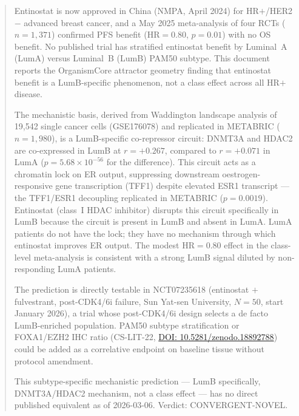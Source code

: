 \documentclass[12pt, a4paper]{article}
\begin{document}
\begin{abstract}
\noindent
Entinostat is now approved in China (NMPA,
April 2024) for HR$+$/HER2$-$ advanced breast
cancer, and a May 2025 meta-analysis of four
RCTs ($n=1{,}371$) confirmed PFS benefit
(HR$=0.80$, $p=0.01$) with no OS benefit. No
published trial has stratified entinostat
benefit by Luminal~A (LumA) versus Luminal~B
(LumB) PAM50 subtype. This document reports
the OrganismCore attractor geometry finding that
entinostat benefit is a LumB-specific phenomenon,
not a class effect across all HR$+$ disease.

The mechanistic basis, derived from Waddington
landscape analysis of 19,542 single cancer cells
(GSE176078) and replicated in METABRIC
($n=1{,}980$), is a LumB-specific co-repressor
circuit: DNMT3A and HDAC2 are co-expressed in
LumB at $r=+0.267$, compared to $r=+0.071$ in
LumA ($p=5.68\times10^{-56}$ for the difference).
This circuit acts as a chromatin lock on ER
output, suppressing downstream oestrogen-responsive
gene transcription (TFF1) despite elevated
ESR1 transcript --- the TFF1/ESR1 decoupling
replicated in METABRIC ($p=0.0019$). Entinostat
(class~I HDAC inhibitor) disrupts this circuit
specifically in LumB because the circuit is
present in LumB and absent in LumA. LumA patients
do not have the lock; they have no mechanism
through which entinostat improves ER output. The
modest HR$=0.80$ effect in the class-level
meta-analysis is consistent with a strong LumB
signal diluted by non-responding LumA patients.

The prediction is directly testable in
NCT07235618 (entinostat $+$ fulvestrant,
post-CDK4/6i failure, Sun Yat-sen University,
$N=50$, start January 2026), a trial whose
post-CDK4/6i design selects a de facto
LumB-enriched population. PAM50 subtype
stratification or FOXA1/EZH2 IHC ratio
(CS-LIT-22,
\href{https://doi.org/10.5281/zenodo.18892788}
{DOI: 10.5281/zenodo.18892788}) could be added
as a correlative endpoint on baseline tissue
without protocol amendment.

This subtype-specific mechanistic prediction ---
LumB specifically, DNMT3A/HDAC2 mechanism,
not a class effect --- has no direct published
equivalent as of 2026-03-06. Verdict:
CONVERGENT-NOVEL.
\end{abstract}

\tableofcontents
\newpage

\end{document}
